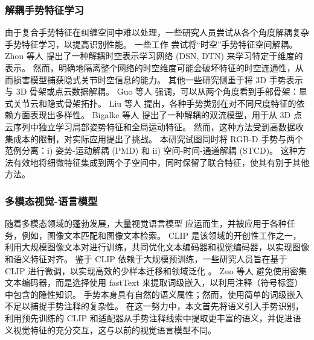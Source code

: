 \subsubsection{解耦手势特征学习}
由于复合手势特征在纠缠空间\cite{zhou2023unified,LI2024110536}中难以处理，一些研究人员尝试从各个角度解耦复杂手势特征学习，以提高识别性能。
一些工作\cite{zhou2022decoupling,LI2024110536} 尝试将“时空”手势特征空间解耦。
Zhou 等人 \cite{zhou2023unified} 提出了一种解耦时空表示学习网络 (DSN, DTN) 来学习特定于维度的表示。
然而，明确地隔离整个网络的时空维度可能会破坏特征的时空连通性，从而损害模型捕获隐式关节时空信息的能力。
其他一些研究侧重于将 3D 手势表示与 3D 骨架或点云数据解耦。
Guo 等人 \cite{GUO2021108044} 强调，可以从两个角度看到手部骨架：显式关节云和隐式骨架拓扑。
Liu 等人\cite{liu2020decoupled} 提出，各种手势类别在对不同尺度特征的依赖方面表现出多样性。
Bigalke 等人 \cite{bigalke2021fusing} 提出了一种解耦的双流模型，用于从 3D 点云序列中独立学习局部姿势特征和全局运动特征。
然而，这种方法受到高数据收集成本的限制，对实际应用提出了挑战。
本研究试图同时将 RGB-D 手势与两个范例分离：i) 姿势-运动解耦 (PMD) 和 ii) 空间-时间-通道解耦 (STCD)。
这种方法有效地将细微特征集成到两个子空间中，同时保留了联合特征，使其有别于其他方法。

\subsubsection{多模态视觉-语言模型}
随着多模态领域的蓬勃发展，大量视觉语言模型 \cite{radford2021learning, li2022blip} 应运而生，并被应用于各种任务，例如，图像文本匹配和图像文本检索。
CLIP \cite{radford2021learning} 是该领域的开创性工作之一，利用大规模图像文本对进行训练，共同优化文本编码器和视觉编码器，以实现图像和语义特征对齐。
鉴于 CLIP 依赖于大规模预训练，一些研究人员旨在基于 CLIP 进行微调，以实现高效的少样本迁移和领域泛化 \cite{gao2024clip}。
Zuo 等人 \cite{zuo2023natural} 避免使用密集文本编码器，而是选择使用 fastText 来提取词级嵌入，以利用注释（符号标签）中包含的隐性知识。
手势本身具有自然的语义属性；然而，使用简单的词级嵌入不足以捕捉手势注释的复杂性。
在这一努力中，本文首先将语义引入手势识别，利用预先训练的 CLIP 和适配器从手势注释线索中提取更丰富的语义，并促进语义视觉特征的充分交互，这与以前的视觉语言模型不同。





